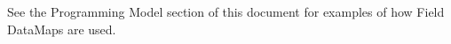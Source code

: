 

See the Programming Model section of this document
for examples of how Field DataMaps are used.



